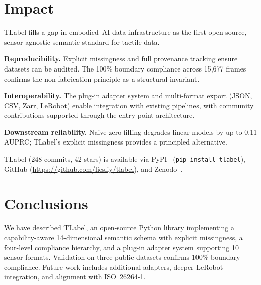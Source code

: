 \documentclass[preprint,12pt,a4paper]{elsarticle}
\begin{document}
\section{Impact}
\label{sec:impact}

TLabel fills a gap in embodied~AI data infrastructure as the first open-source, sensor-agnostic semantic standard for tactile data.

\textbf{Reproducibility.} Explicit missingness and full provenance tracking ensure datasets can be audited. The 100\% boundary compliance across 15,677 frames confirms the non-fabrication principle as a structural invariant.

\textbf{Interoperability.} The plug-in adapter system and multi-format export (JSON, CSV, Zarr, LeRobot) enable integration with existing pipelines, with community contributions supported through the entry-point architecture.

\textbf{Downstream reliability.} Naive zero-filling degrades linear models by up to 0.11 AUPRC; TLabel's explicit missingness provides a principled alternative.

TLabel (248 commits, 42 stars) is available via PyPI~\cite{tlabel_pypi} (\texttt{pip install tlabel}), GitHub (\url{https://github.com/liesliy/tlabel}), and Zenodo~\cite{tlabel_zenodo}.

\section{Conclusions}
\label{sec:conclusion}

We have described TLabel, an open-source Python library implementing a capability-aware 14-dimensional semantic schema with explicit missingness, a four-level compliance hierarchy, and a plug-in adapter system supporting 10 sensor formats. Validation on three public datasets confirms 100\% boundary compliance. Future work includes additional adapters, deeper LeRobot integration, and alignment with ISO~26264-1.

\end{document}
